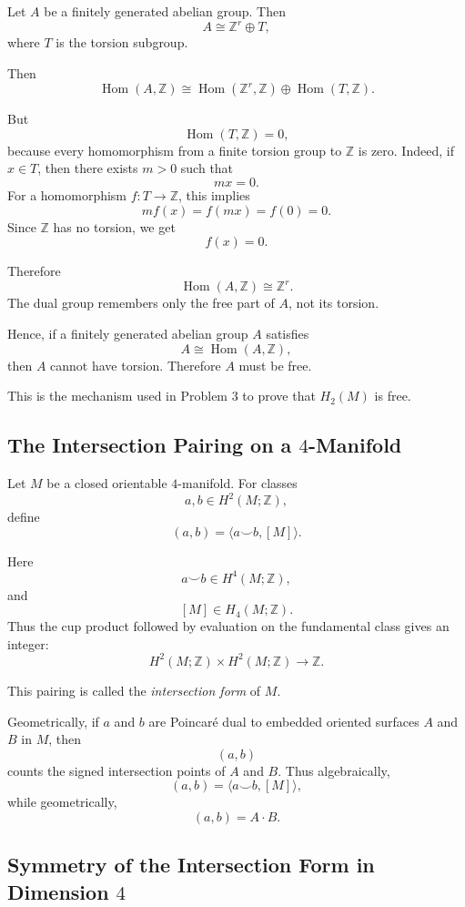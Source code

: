 \documentclass[12pt,a4paper]{article}
\theoremstyle{notespace}
\begin{document}
Let \(A\) be a finitely generated abelian group. Then
\[
A\cong \mathbb Z^r\oplus T,
\]
where \(T\) is the torsion subgroup.

Then
\[
\operatorname{Hom}(A,\mathbb Z)
\cong
\operatorname{Hom}(\mathbb Z^r,\mathbb Z)
\oplus
\operatorname{Hom}(T,\mathbb Z).
\]

But
\[
\operatorname{Hom}(T,\mathbb Z)=0,
\]
because every homomorphism from a finite torsion group to \(\mathbb Z\) is zero.
Indeed, if \(x\in T\), then there exists \(m>0\) such that
\[
mx=0.
\]
For a homomorphism \(f:T\to \mathbb Z\), this implies
\[
m f(x)=f(mx)=f(0)=0.
\]
Since \(\mathbb Z\) has no torsion, we get
\[
f(x)=0.
\]

Therefore
\[
\operatorname{Hom}(A,\mathbb Z)\cong \mathbb Z^r.
\]
The dual group remembers only the free part of \(A\), not its torsion.

Hence, if a finitely generated abelian group \(A\) satisfies
\[
A\cong \operatorname{Hom}(A,\mathbb Z),
\]
then \(A\) cannot have torsion. Therefore \(A\) must be free.

This is the mechanism used in Problem 3 to prove that \(H_2(M)\) is free.

\subsection{The Intersection Pairing on a \(4\)-Manifold}

Let \(M\) be a closed orientable \(4\)-manifold. For classes
\[
a,b\in H^2(M;\mathbb Z),
\]
define
\[
(a,b)=\langle a\smile b,[M]\rangle.
\]

Here
\[
a\smile b\in H^4(M;\mathbb Z),
\]
and
\[
[M]\in H_4(M;\mathbb Z).
\]
Thus the cup product followed by evaluation on the fundamental class gives an
integer:
\[
H^2(M;\mathbb Z)\times H^2(M;\mathbb Z)\longrightarrow \mathbb Z.
\]

This pairing is called the \emph{intersection form} of \(M\).

Geometrically, if \(a\) and \(b\) are Poincaré dual to embedded oriented surfaces
\(A\) and \(B\) in \(M\), then
\[
(a,b)
\]
counts the signed intersection points of \(A\) and \(B\). Thus algebraically,
\[
(a,b)=\langle a\smile b,[M]\rangle,
\]
while geometrically,
\[
(a,b)=A\cdot B.
\]

\subsection{Symmetry of the Intersection Form in Dimension \(4\)}
\end{document}

